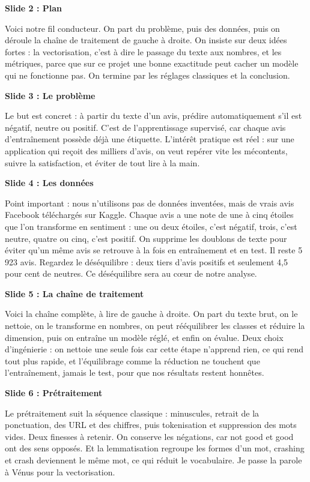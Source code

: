 \documentclass[11pt,a4paper]{article}
\newenvironment{turn}[2]%
{\begin{mdframed}[linewidth=0pt,backgroundcolor=panel,skipabove=6pt,skipbelow=6pt,
   innerleftmargin=10pt,innerrightmargin=10pt,innertopmargin=7pt,innerbottommargin=7pt,
   leftline=true,linecolor=#1,linewidth=3pt]%
 {\color{#1}\bfseries #2}\par\vspace{2pt}}
{\end{mdframed}}
\begin{document}
\begin{turn}{yann}{Slide 2 : Plan}
Voici notre fil conducteur. On part du problème, puis des données, puis on déroule la
chaîne de traitement de gauche à droite. On insiste sur deux idées fortes : la
vectorisation, c'est à dire le passage du texte aux nombres, et les métriques, parce que
sur ce projet une bonne exactitude peut cacher un modèle qui ne fonctionne pas. On
termine par les réglages classiques et la conclusion.
\end{turn}

\begin{turn}{yann}{Slide 3 : Le problème}
Le but est concret : à partir du texte d'un avis, prédire automatiquement s'il est
négatif, neutre ou positif. C'est de l'apprentissage supervisé, car chaque avis
d'entraînement possède déjà une étiquette. L'intérêt pratique est réel : sur une
application qui reçoit des milliers d'avis, on veut repérer vite les mécontents, suivre
la satisfaction, et éviter de tout lire à la main.
\end{turn}

\begin{turn}{yann}{Slide 4 : Les données}
Point important : nous n'utilisons pas de données inventées, mais de vrais avis Facebook
téléchargés sur Kaggle. Chaque avis a une note de une à cinq étoiles que l'on transforme
en sentiment : une ou deux étoiles, c'est négatif, trois, c'est neutre, quatre ou cinq,
c'est positif. On supprime les doublons de texte pour éviter qu'un même avis se retrouve
à la fois en entraînement et en test. Il reste 5\,923 avis. Regardez le déséquilibre :
deux tiers d'avis positifs et seulement 4,5 pour cent de neutres. Ce déséquilibre sera au
cœur de notre analyse.
\end{turn}

\begin{turn}{yann}{Slide 5 : La chaîne de traitement}
Voici la chaîne complète, à lire de gauche à droite. On part du texte brut, on le
nettoie, on le transforme en nombres, on peut rééquilibrer les classes et réduire la
dimension, puis on entraîne un modèle réglé, et enfin on évalue. Deux choix
d'ingénierie : on nettoie une seule fois car cette étape n'apprend rien, ce qui rend
tout plus rapide, et l'équilibrage comme la réduction ne touchent que l'entraînement,
jamais le test, pour que nos résultats restent honnêtes.
\end{turn}

\begin{turn}{yann}{Slide 6 : Prétraitement}
Le prétraitement suit la séquence classique : minuscules, retrait de la ponctuation, des
URL et des chiffres, puis tokenisation et suppression des mots vides. Deux finesses à
retenir. On conserve les négations, car not good et good ont des sens opposés. Et la
lemmatisation regroupe les formes d'un mot, crashing et crash deviennent le même mot, ce
qui réduit le vocabulaire. Je passe la parole à Vénus pour la vectorisation.
\end{turn}
\end{document}
